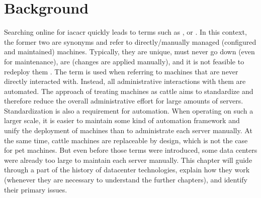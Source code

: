 \chapter{Background}



Searching online for \gls{iacacr} quickly leads to terms such as ,  or  \cite{snowflake_servers}.
In this context, the former two are synonyms and refer to directly/manually managed (configured and maintained) machines. Typically, they are unique, must never go down (even for maintenance), are  (changes are applied manually), and it is not feasible to redeploy them \cite{pets_vs_cattle}. The term  is used when referring to machines that are never directly interacted with. Instead, all administrative interactions with them are automated.
The approach of treating machines as cattle aims to standardize and therefore reduce the overall administrative effort for large amounts of servers. Standardization is also a requirement for automation. When operating on such a larger scale, it is easier to maintain some kind of automation framework and unify the deployment of machines than to administrate each server manually. At the same time, cattle machines are replaceable by design, which is not the case for pet machines.
But even before those terms were introduced, some data centers were already too large to maintain each server manually.
This chapter will guide through a part of the history of datacenter technologies, explain how they work (whenever they are necessary to understand the further chapters), and identify their primary issues.


